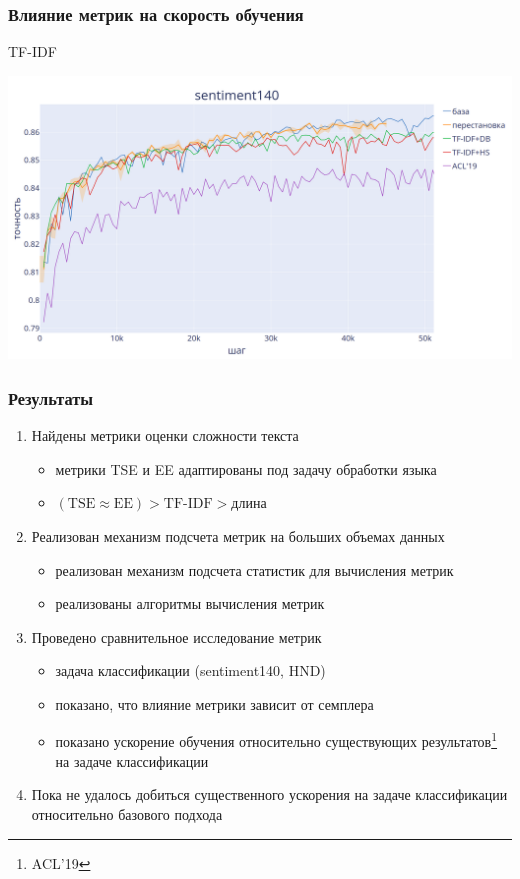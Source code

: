 \documentclass{beamer}
\begin{document}
\begin{frame}
	\frametitle{Влияние метрик на скорость обучения}
	TF-IDF
	\begin{center}
		\includegraphics[scale=0.18]{s140_tf_idf_final}
	\end{center}
\end{frame}

\begin{frame}
	\frametitle{Результаты}
	\begin{enumerate}
		\item Найдены метрики оценки сложности текста
			\begin{itemize}
				\item метрики TSE и EE адаптированы под задачу обработки языка
				\item $(\text{TSE} \approx \text{EE}) > \text{TF-IDF} > \text{длина}$
			\end{itemize}
		\item Реализован механизм подсчета метрик на больших объемах данных
			\begin{itemize}
				\item реализован механизм подсчета статистик для вычисления метрик
				\item реализованы алгоритмы вычисления метрик
			\end{itemize}
		\item Проведено сравнительное исследование метрик
			\begin{itemize}
				\item задача классификации (sentiment140, HND)
				\item показано, что влияние метрики зависит от семплера
				\item показано ускорение обучения относительно существующих результатов\footnote[1]{ACL'19} на задаче классификации
			\end{itemize}
		\item Пока не удалось добиться существенного ускорения на задаче классификации относительно базового подхода
	\end{enumerate}
\end{frame}
\end{document}
